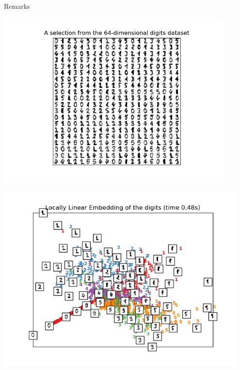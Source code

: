 \begin{frame}{Remarks}


\begin{minipage}{0.47\textwidth}
\begin{center}
	\includegraphics[width=0.9\textwidth]{img/digits}
\end{center}
\end{minipage}
\begin{minipage}{0.47\textwidth}
\begin{center}
	\includegraphics[width=0.95\textwidth]{img/digits_lle}
\end{center}
\end{minipage}

\pause


\end{frame}
